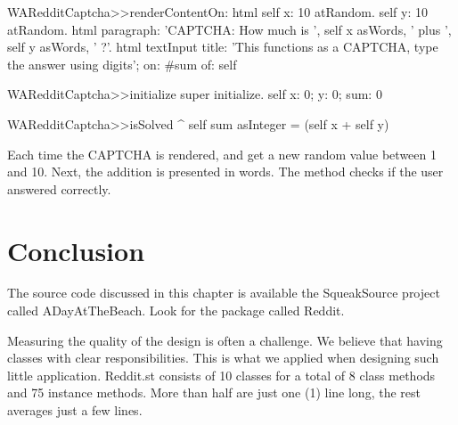\documentclass[a4paper,10pt,twoside]{book}
\begin{document}
\begin{code}{}
WARedditCaptcha>>renderContentOn: html
	self x: 10 atRandom. 
	self y: 10 atRandom. 
	html paragraph: 'CAPTCHA: How much is ', 
		self x asWords, ' plus ', self y asWords, ' ?'. 
	html textInput 
		title: 'This functions as a CAPTCHA, type the answer using digits'; 
		on: #sum of: self
\end{code}

\begin{code}{}
WARedditCaptcha>>initialize
	super initialize. 
	self x: 0; y: 0; sum: 0
\end{code}

\begin{code}{}
WARedditCaptcha>>isSolved
	^ self sum asInteger = (self x + self y)
\end{code}

Each time the CAPTCHA is rendered,  and  get a new random value between 1 and 10. Next, the addition is presented in words. The  method checks if the user answered correctly.

\section{Conclusion}

The source code discussed in this chapter is available the SqueakSource project called ADayAtTheBeach. Look for the package called Reddit.

Measuring the quality of the design is often a challenge. We believe that having classes with clear responsibilities. This is what we applied when designing such little application. Reddit.st consists of 10 classes for a total of 8 class methods and 75 instance methods. More than half are just one (1) line long, the rest averages just a few lines.



\ifx\wholebook\relax\else
    
    
\end{document}
